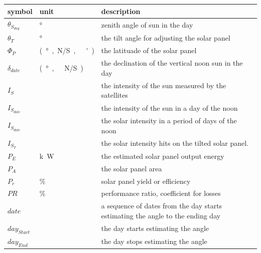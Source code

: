 \documentclass[12pt]{article}
\begin{document}
\renewcommand{\arraystretch}{1.2}
\noindent \begin{longtable*}{l l p{12cm}} \toprule
\textbf{symbol} & \textbf{unit} & \textbf{description}\\
\midrule 
$\theta_{S_{day}}$ & \si[per-mode=symbol] {\degree} & zenith angle of sun in the day
\\
$\theta_{T}$ & \si[per-mode=symbol] {\degree} & the tilt angle for adjusting the solar panel
\\
$\Phi_P$ & \si[per-mode=symbol] {(\degree, \N/S, \  ')} & the latituade of the solar panel
\\ 
$\delta_{date}$ & \si[per-mode=symbol] {(\degree, \ N/S)} & the declination of the vertical noon sun in the day
\\ 
$I_{S}$ & \si[per-mode=symbol] {} & the intensity of the sun measured by the satellites
\\ 
$I_{S_{date}}$ & \si[per-mode=symbol] {} & the intensity of the sun in a day of the noon
\\ 
$I_{S_{date}}$ & \si[per-mode=symbol] {} & the solar intensity in a period of days of the noon
\\ 
$I_{S_{T}}$ & \si[per-mode=symbol] {} & the solar intensity hits on the tilted solar panel. 
\\ 
$P_{E}$ & \si[per-mode=symbol] {k\watt} &the estimated solar panel output energy
\\ 
$P_{A}$ & \si[per-mode=symbol] {} & the solar panel area
\\ 
$P_{r}$ & \si[per-mode=symbol] {\%} & solar panel yield or efficiency
\\ 
$PR$ & \si[per-mode=symbol] {\%} & performance ratio, coefficient for losses 
\\ 
$date$ & \si[per-mode=symbol] {\text{-}} & a sequence of dates from the day starts estimating the angle to the ending day
\\ 
$day_{Start}$ & \si[per-mode=symbol] {\text{-}} & the day starts estimating the angle
\\ 
$day_{End}$ & \si[per-mode=symbol] {\text{-}} & the day stops estimating the angle
\\ 
\bottomrule
\end{longtable*}

\end{document}
